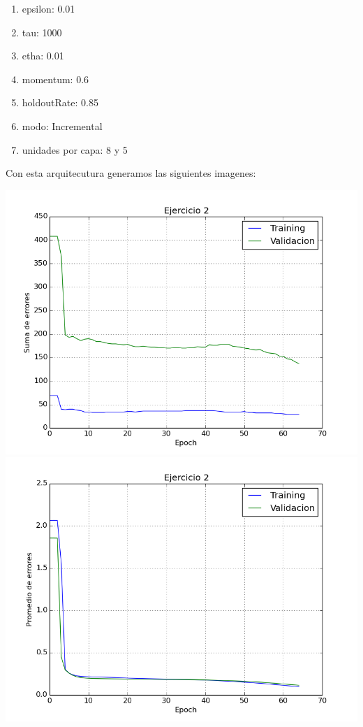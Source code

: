 \begin{enumerate}
\item epsilon: 0.01
\item tau: 1000
\item etha: 0.01
\item momentum: 0.6
\item holdoutRate: 0.85
\item modo: Incremental
\item unidades por capa: 8 y 5
\end{enumerate}

Con esta arquitecutura generamos las siguientes imagenes:

\includegraphics[scale=0.4]{img/asum}
\includegraphics[scale=0.4]{img/bmean}

